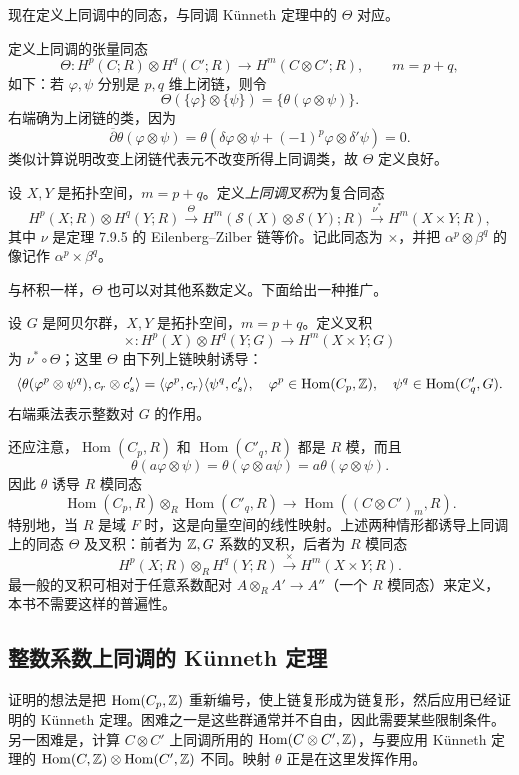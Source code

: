 现在定义上同调中的同态，与同调 Künneth 定理中的 $\Theta$ 对应。

定义上同调的张量同态
\[
\Theta:H^p(C;R)\otimes H^q(C';R)\longrightarrow H^m(C\otimes C';R),\qquad m=p+q,
\]
如下：若 $\varphi,\psi$ 分别是 $p,q$ 维上闭链，则令
\[
\Theta(\{\varphi\}\otimes\{\psi\})=\{\theta(\varphi\otimes\psi)\}.
\]
右端确为上闭链的类，因为
\[
\overline\partial\theta(\varphi\otimes\psi)
=\theta(\delta\varphi\otimes\psi+(-1)^p\varphi\otimes\delta'\psi)=0.
\]
类似计算说明改变上闭链代表元不改变所得上同调类，故 $\Theta$ 定义良好。

设 $X,Y$ 是拓扑空间，$m=p+q$。定义\emph{上同调叉积}为复合同态
\[
H^p(X;R)\otimes H^q(Y;R)\xrightarrow{\Theta}
H^m(\mathcal S(X)\otimes\mathcal S(Y);R)\xrightarrow{\nu^*}H^m(X\times Y;R),
\]
其中 $\nu$ 是定理 7.9.5 的 Eilenberg--Zilber 链等价。记此同态为 $\times$，并把 $\alpha^p\otimes\beta^q$ 的像记作 $\alpha^p\times\beta^q$。

与杯积一样，$\Theta$ 也可以对其他系数定义。下面给出一种推广。

设 $G$ 是阿贝尔群，$X,Y$ 是拓扑空间，$m=p+q$。定义叉积
\[
\times:H^p(X)\otimes H^q(Y;G)\longrightarrow H^m(X\times Y;G)
\]
为 $\nu^*\circ\Theta$；这里 $\Theta$ 由下列上链映射诱导：
\[
\langle\theta(\varphi^p\otimes\psi^q),c_r\otimes c'_s\rangle
=\langle\varphi^p,c_r\rangle\langle\psi^q,c'_s\rangle,
\quad \varphi^p\in\operatorname{Hom}(C_p,\mathbb{Z}),\quad
\psi^q\in\operatorname{Hom}(C'_q,G).
\]
右端乘法表示整数对 $G$ 的作用。

还应注意，$\operatorname{Hom}(C_p,R)$ 和 $\operatorname{Hom}(C'_q,R)$ 都是 $R$ 模，而且
\[
\theta(a\varphi\otimes\psi)=\theta(\varphi\otimes a\psi)=a\theta(\varphi\otimes\psi).
\]
因此 $\theta$ 诱导 $R$ 模同态
\[
\operatorname{Hom}(C_p,R)\otimes_R\operatorname{Hom}(C'_q,R)
\longrightarrow\operatorname{Hom}((C\otimes C')_m,R).
\]
特别地，当 $R$ 是域 $F$ 时，这是向量空间的线性映射。上述两种情形都诱导上同调上的同态 $\Theta$ 及叉积：前者为 $\mathbb{Z},G$ 系数的叉积，后者为 $R$ 模同态
\[
H^p(X;R)\otimes_R H^q(Y;R)\xrightarrow{\times}H^m(X\times Y;R).
\]
最一般的叉积可相对于任意系数配对 $A\otimes_R A'\to A''$（一个 $R$ 模同态）来定义，本书不需要这样的普遍性。

\subsection*{整数系数上同调的 Künneth 定理}
证明的想法是把 $\operatorname{Hom}(C_p,\mathbb{Z})$ 重新编号，使上链复形成为链复形，然后应用已经证明的 Künneth 定理。困难之一是这些群通常并不自由，因此需要某些限制条件。另一困难是，计算 $C\otimes C'$ 上同调所用的 $\operatorname{Hom}(C\otimes C',\mathbb{Z})$，与要应用 Künneth 定理的 $\operatorname{Hom}(C,\mathbb{Z})\otimes\operatorname{Hom}(C',\mathbb{Z})$ 不同。映射 $\theta$ 正是在这里发挥作用。


